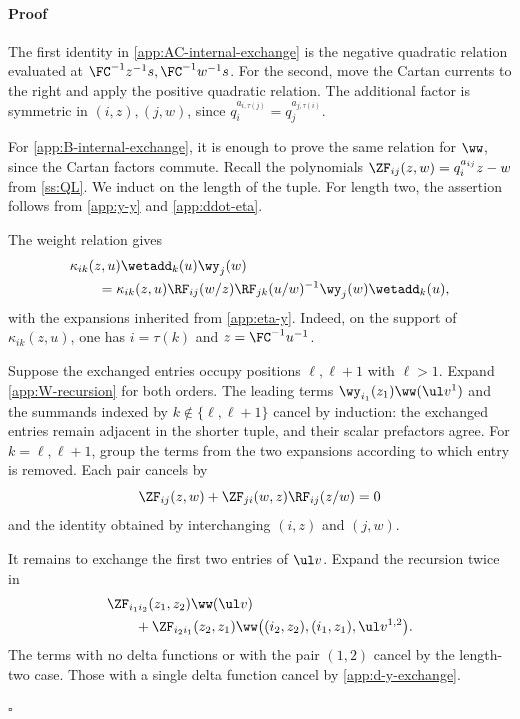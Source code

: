 \documentclass[reqno]{amsart}
\numberwithin{equation}{section}
\newenvironment{pf}{\medskip\paragraph{{\sc Proof}}}{\hfill$\square$\par\medskip}
\begin{document}
\begin{pf}
	The first identity in \eqref{app:AC-internal-exchange} is the negative
	quadratic relation evaluated at ${\FC^{-1}z^{-1}} s,{\FC^{-1}w^{-1}} s$.
	For the second, move the Cartan currents to the right and apply the
	positive quadratic relation. The additional factor is symmetric in
	$(i,z),(j,w)$, since $q_i^{a_{i,\tau(j)}}=q_j^{a_{j,\tau(i)}}$.
	
	For \eqref{app:B-internal-exchange}, it is enough to prove the same
	relation for $\ww$, since the Cartan factors commute. Recall the
	polynomials $\ZF_{ij}(z,w)=q_i^{a_{ij}}z-w$ from \ref{ss:QL}.
	We induct on the length of the tuple. For length two, the assertion
	follows from \eqref{app:y-y} and \eqref{app:ddot-eta}.
	
	The weight relation gives
	\begin{equation}
		\begin{aligned}
			&\kappa_{ik}(z,u)\wetadd_k(u)\wy_j(w)\\
			&\qquad=\kappa_{ik}(z,u)\RF_{ij}(w/z)\RF_{jk}(u/w)^{-1}
			\wy_j(w)\wetadd_k(u),
		\end{aligned}
		\label{app:d-y-exchange}
	\end{equation}
	with the expansions inherited from \eqref{app:eta-y}. Indeed, on the
	support of $\kappa_{ik}(z,u)$, one has $i=\tau(k)$ and $z={\FC^{-1}u^{-1}}$.
	
	Suppose the exchanged entries occupy positions $\ell,\ell+1$ with $\ell>1$.
		Expand \eqref{app:W-recursion} for both orders. The leading terms
		$\wy_{i_1}(z_1)\ww(\ul v^1)$ and the summands indexed by
		$k\notin\{\ell,\ell+1\}$ cancel by induction: the exchanged entries remain
		adjacent in the shorter tuple, and their scalar prefactors agree.
		For $k=\ell,\ell+1$, group the terms from the two expansions according
		to which entry is removed. Each pair cancels by
	\[
	\ZF_{ij}(z,w)+\ZF_{ji}(w,z)\RF_{ij}(z/w)=0
	\]
	and the identity obtained by interchanging $(i,z)$ and $(j,w)$.
	
	It remains to exchange the first two entries of $\ul v$. Expand the
	recursion twice in
	\[
	\begin{aligned}
		&\ZF_{i_1i_2}(z_1,z_2)\ww(\ul v)\\
		&\qquad+\ZF_{i_2i_1}(z_2,z_1)
		\ww\bigl((i_2,z_2),(i_1,z_1),\ul v^{1,2}\bigr).
	\end{aligned}
	\]
	The terms with no delta functions or with the pair $(1,2)$ cancel by the
	length-two case. Those with a single delta function cancel by
	\eqref{app:d-y-exchange}.
	

\end{pf}
\end{document}
